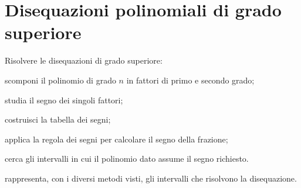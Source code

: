%  
% 
% 

\section{Disequazioni polinomiali di grado superiore}
\label{sec:diseq_grado_superiore}

\begin{procedura}
Risolvere le disequazioni di grado superiore:
\begin{enumeratea}
\item scomponi il polinomio di grado \(n\) in fattori di primo e secondo 
grado;
\item studia il segno dei singoli fattori;
\item costruisci la tabella dei segni;
\item applica la regola dei segni per calcolare il segno della frazione;
\item cerca gli intervalli in cui il polinomio dato assume il segno richiesto.
\item rappresenta, con i diversi metodi visti, gli intervalli che 
 risolvono la disequazione.
\end{enumeratea}
\end{procedura}

